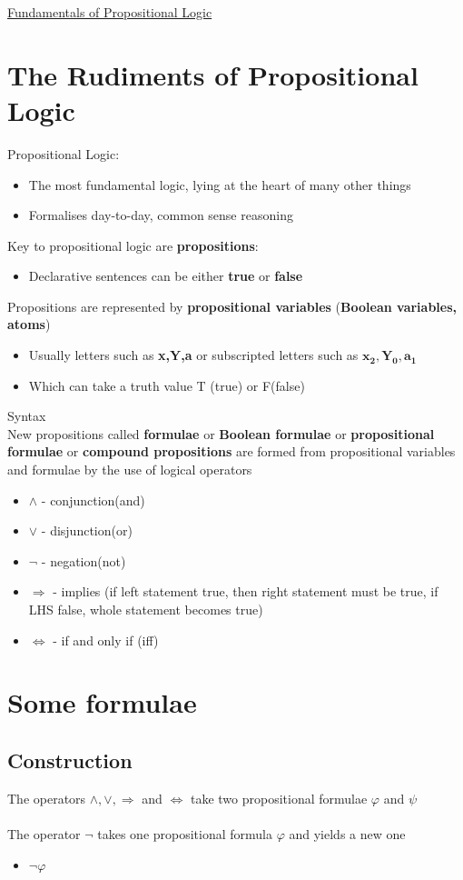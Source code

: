 \documentclass{article}[18pt]
\begin{document}
\begin{center}
\underline{\huge Fundamentals of Propositional Logic}
\end{center}
\section{The Rudiments of Propositional Logic}
Propositional Logic:
\begin{itemize}
\item The most fundamental logic, lying at the heart of many other things
\item Formalises day-to-day, common sense reasoning
\end{itemize}
Key to propositional logic are \textbf{propositions}:
\begin{itemize}
\item Declarative sentences can be either \textbf{true} or \textbf{false}
\end{itemize}
Propositions are represented by \textbf{propositional variables} (\textbf{Boolean variables, atoms})
\begin{itemize}
\item Usually letters such as \textbf{x,Y,a} or subscripted letters such as $\mathbf{x_2,Y_0,a_1}$
\item Which can take a truth value T (true) or F(false)
\end{itemize}
Syntax\\
New propositions called \textbf{formulae} or \textbf{Boolean formulae} or \textbf{propositional formulae} or \textbf{compound propositions} are formed from propositional variables and formulae by the use of logical operators
\begin{itemize}
\item $\land$ - conjunction(and)
\item $\lor$ - disjunction(or)
\item $\lnot$ - negation(not)
\item $\Rightarrow$ - implies (if left statement true, then right statement must be true, if LHS false, whole statement becomes true)
\item $\Leftrightarrow$ - if and only if (iff)
\end{itemize}
\section{Some formulae}
\subsection{Construction}
The operators $\land, \lor , \Rightarrow$ and $\Leftrightarrow$ take two propositional formulae $\varphi$ and $\psi$\\
\\
The operator $\lnot$ takes one propositional formula $\varphi$ and yields a new one
\begin{itemize}
\item $\lnot\varphi$
\end{itemize}
\end{document}
